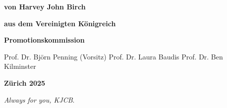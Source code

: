 \documentclass[a4paper,11pt,usegeometry]{scrreprt} %
\begin{document}
\begin{titlepage}
\begin{center}
\bfseries %
von%
\break
\break
\mdseries %
Harvey John Birch%
\break

\bfseries %
aus%
\break
\break
\mdseries %
dem Vereinigten K\"onigreich%
\break
\break
\break
\break

\bfseries %
Promotionskommission%
\vspace{3pt}%
\break
\break
\hspace*{11.5mm}%
\begin{minipage}{7cm}
\flushleft %
\mdseries %
Prof. Dr. Bj\"orn Penning (Vorsitz) %
\break
\break
Prof. Dr.  Laura Baudis%
\break
\break
Prof. Dr. Ben Kilminster%
\end{minipage}
\break
\break
\break
\break
\break
\break

\bfseries%
Z\"urich 2025%

\end{center}
\end{titlepage}
\restoregeometry
{}
\newpage\null\thispagestyle{empty}\newpage
\clearpage
\vspace*{\fill}
\begin{center}
\begin{minipage}{.6\textwidth}
\textit{Always for you, KJCB}.
\end{minipage}
\end{center}
\vfill %
\clearpage
\newpage\null\thispagestyle{empty}\newpage
\justifying
\end{document}
